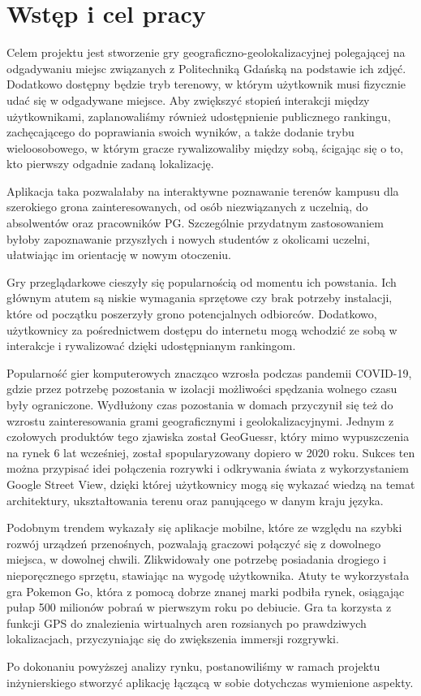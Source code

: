 \chapter{Wstęp i cel pracy}
\label{chap:introduction}

Celem projektu jest stworzenie gry geograficzno-geolokalizacyjnej polegającej na odgadywaniu miejsc związanych z Politechniką Gdańską na podstawie ich zdjęć. Dodatkowo dostępny będzie tryb terenowy, w którym użytkownik musi fizycznie udać się w odgadywane miejsce. Aby zwiększyć stopień interakcji między użytkownikami, zaplanowaliśmy również udostępnienie publicznego rankingu, zachęcającego do poprawiania swoich wyników, a także dodanie trybu wieloosobowego, w którym gracze rywalizowaliby między sobą, ścigając się o to, kto pierwszy odgadnie zadaną lokalizację.

Aplikacja taka pozwalałaby na interaktywne poznawanie terenów kampusu dla szerokiego grona zainteresowanych, od osób niezwiązanych z uczelnią, do absolwentów oraz pracowników PG. Szczególnie przydatnym zastosowaniem byłoby zapoznawanie przyszłych i nowych studentów z okolicami uczelni, ułatwiając im orientację w nowym otoczeniu.

Gry przeglądarkowe cieszyły się popularnością od momentu ich powstania. Ich głównym atutem są niskie wymagania sprzętowe czy brak potrzeby instalacji, które od początku poszerzyły grono potencjalnych odbiorców. Dodatkowo, użytkownicy za pośrednictwem dostępu do internetu mogą wchodzić ze sobą w interakcje i rywalizować dzięki udostępnianym rankingom.

Popularność gier komputerowych znacząco wzrosła podczas pandemii COVID-19, gdzie przez potrzebę pozostania w izolacji możliwości spędzania wolnego czasu były ograniczone. Wydłużony czas pozostania w domach przyczynił się też do wzrostu zainteresowania grami geograficznymi i geolokalizacyjnymi. Jednym z czołowych produktów tego zjawiska został GeoGuessr, który mimo wypuszczenia na rynek 6 lat wcześniej, został spopularyzowany dopiero w 2020 roku. Sukces ten można przypisać idei połączenia rozrywki i odkrywania świata z wykorzystaniem Google Street View, dzięki której użytkownicy mogą się wykazać wiedzą na temat architektury, ukształtowania terenu oraz panującego w danym kraju języka.

Podobnym trendem wykazały się aplikacje mobilne, które ze względu na szybki rozwój urządzeń przenośnych, pozwalają graczowi połączyć się z dowolnego miejsca, w dowolnej chwili. Zlikwidowały one potrzebę posiadania drogiego i nieporęcznego sprzętu, stawiając na wygodę użytkownika. Atuty te wykorzystała gra Pokemon Go, która z pomocą dobrze znanej marki podbiła rynek, osiągając pułap 500 milionów pobrań w pierwszym roku po debiucie. Gra ta korzysta z funkcji GPS do znalezienia wirtualnych aren rozsianych po prawdziwych lokalizacjach, przyczyniając się do zwiększenia immersji rozgrywki.

Po dokonaniu powyższej analizy rynku, postanowiliśmy w ramach projektu inżynierskiego stworzyć aplikację łączącą w sobie dotychczas wymienione aspekty.
